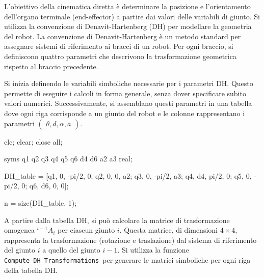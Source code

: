 \documentclass[11pt, a4paper]{article}
\begin{document}

\begin{par}
\begin{flushleft}
L'obiettivo della cinematica diretta è determinare la posizione e l'orientamento dell'organo terminale (end-effector) a partire dai valori delle variabili di giunto. Si utilizza la convenzione di Denavit-Hartenberg (DH) per modellare la geometria del robot. La convenzione di Denavit-Hartenberg è un metodo standard per assegnare sistemi di riferimento ai bracci di un robot. Per ogni braccio, si definiscono quattro parametri che descrivono la trasformazione geometrica rispetto al braccio precedente.
\end{flushleft}
\end{par}

\begin{par}
\begin{flushleft}
Si inizia definendo le variabili simboliche necessarie per i parametri DH. Questo permette di eseguire i calcoli in forma generale, senza dover specificare subito valori numerici. Successivamente, si assemblano questi parametri in una tabella dove ogni riga corrisponde a un giunto del robot e le colonne rappresentano i parametri $\left(\begin{array}{c}
\theta ,d,\alpha ,a
\end{array}\right)$.
\end{flushleft}
\end{par}

\begin{matlabcode}
clc;
clear;
close all;

syms q1 q2 q3 q4 q5 q6 d4 d6 a2 a3 real;

DH_table = [q1, 0,  -pi/2, 0;
            q2, 0,   0,    a2;
            q3, 0,  -pi/2, a3;
            q4, d4,  pi/2, 0;
            q5, 0,  -pi/2, 0;
            q6, d6,  0,    0];


n = size(DH_table, 1);
\end{matlabcode}

\begin{par}
\begin{flushleft}
A partire dalla tabella DH, si può calcolare la matrice di trasformazione omogenea $^{i-1}A_i$ per ciascun giunto $i$. Questa matrice, di dimensioni $4\times 4$, rappresenta la trasformazione (rotazione e traslazione) dal sistema di riferimento del giunto $i$ a quello del giunto $i-1$. Si utilizza la funzione \texttt{Compute\_DH\_Transformations }per generare le matrici simboliche per ogni riga della tabella DH.
\end{flushleft}
\end{par}
\end{document}
